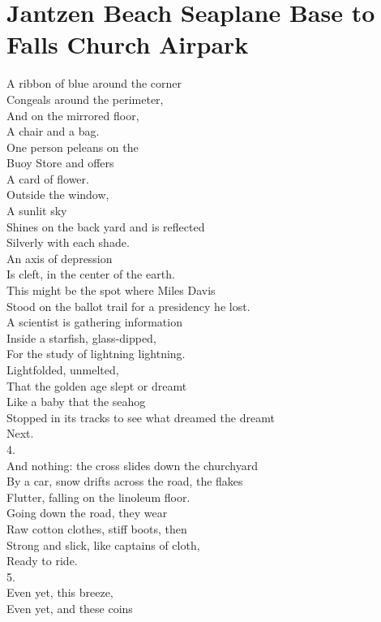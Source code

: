 \documentclass[smalldemyvopaper,11pt,twoside,onecolumn,openright,extrafontsizes]{memoir}
\begin{document}
\chapter{Jantzen Beach Seaplane Base to Falls Church Airpark}
A ribbon of blue around the corner
\\Congeals around the perimeter,
\\And on the mirrored floor,
\\A chair and a bag.
\\One person peleans on the
\\Buoy Store and offers
\\A card of flower.
\\Outside the window,
\\A sunlit sky
\\Shines on the back yard and is reflected
\\Silverly with each shade.
\\An axis of depression
\\Is cleft, in the center of the earth.
\\This might be the spot where Miles Davis
\\Stood on the ballot trail for a presidency he lost.
\\A scientist is gathering information
\\Inside a starfish, glass-dipped,
\\For the study of lightning lightning.
\\Lightfolded, unmelted,
\\That the golden age slept or dreamt
\\Like a baby that the seahog
\\Stopped in its tracks to see what dreamed the dreamt
\\Next.
\\4.
\\And nothing: the cross slides down the churchyard
\\By a car, snow drifts across the road, the flakes
\\Flutter, falling on the linoleum floor.
\\Going down the road, they wear
\\Raw cotton clothes, stiff boots, then
\\Strong and slick, like captains of cloth,
\\Ready to ride.
\\5.
\\Even yet, this breeze,
\\Even yet, and these coins
\end{document}
